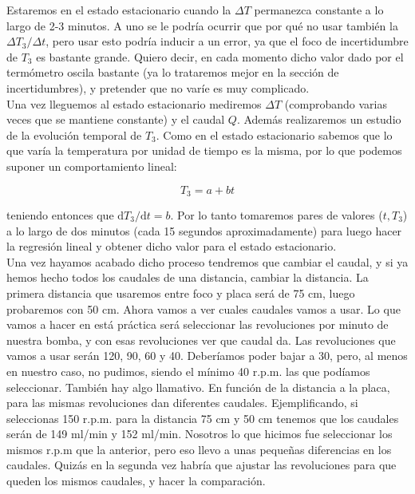 \documentclass[12pt,a4paper]{article}
\newcommand{\D}{\mathrm{d}}
\begin{document}
Estaremos en el estado estacionario cuando la $\Delta T$ permanezca constante a lo largo de 2-3 minutos. A uno se le podría ocurrir que por qué no usar también la $\Delta T_3/\Delta t$, pero usar esto podría inducir a un error, ya que el foco de incertidumbre de $T_3$ es bastante grande. Quiero decir, en cada momento dicho valor dado por el termómetro oscila bastante (ya lo trataremos mejor en la sección de incertidumbres), y pretender que no varíe es muy complicado.  \\

Una vez lleguemos al estado estacionario mediremos $\Delta T$ (comprobando varias veces que se mantiene constante) y el caudal $Q$. Además realizaremos un estudio de la evolución temporal de $T_3$. Como en el estado estacionario  sabemos que lo que varía la temperatura por unidad de tiempo es la misma, por lo que podemos suponer un comportamiento lineal:

\begin{equation}
T_3 = a + b t
\end{equation}

teniendo entonces que $\D T_3 / \D t = b$. Por lo tanto tomaremos pares de valores ($t,T_3$) a lo largo de dos minutos (cada 15 segundos aproximadamente) para luego hacer la regresión lineal y obtener dicho valor para el estado estacionario. \\

Una vez hayamos acabado dicho proceso tendremos que cambiar el caudal, y si ya hemos hecho todos los caudales de una distancia, cambiar la distancia. La primera distancia que usaremos entre foco y placa será de 75 cm, luego probaremos con 50 cm. Ahora vamos a ver cuales caudales vamos a usar. Lo que vamos a hacer en está práctica será seleccionar las revoluciones por minuto de nuestra bomba, y con esas revoluciones ver que caudal da. Las revoluciones que vamos a usar serán 120, 90, 60 y 40. Deberíamos poder bajar a 30, pero, al menos en nuestro caso, no pudimos, siendo el mínimo 40 r.p.m. las que podíamos seleccionar. También hay algo llamativo. En función de la distancia a la placa, para las mismas revoluciones dan diferentes caudales. Ejemplificando, si seleccionas 150 r.p.m. para la distancia 75 cm y 50 cm tenemos que los caudales serán de 149 ml/min y 152 ml/min. Nosotros lo que hicimos fue seleccionar los mismos r.p.m que la anterior, pero eso llevo a unas pequeñas diferencias en los caudales. Quizás en la segunda vez habría que ajustar las revoluciones para que queden los mismos caudales, y hacer la comparación. 
\end{document}
